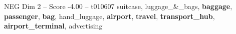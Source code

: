 \begin{textsample}{NEG Dim 2 – Score -4.00 – t010607}  \label{ex:f2_neg_013}
suitcase, luggage\_\&\_bags, \textbf{baggage}, \textbf{passenger}, \textbf{bag}, hand\_luggage, \textbf{airport}, \textbf{travel}, \textbf{transport\_hub}, \textbf{airport\_terminal}, advertising

\end{textsample}
